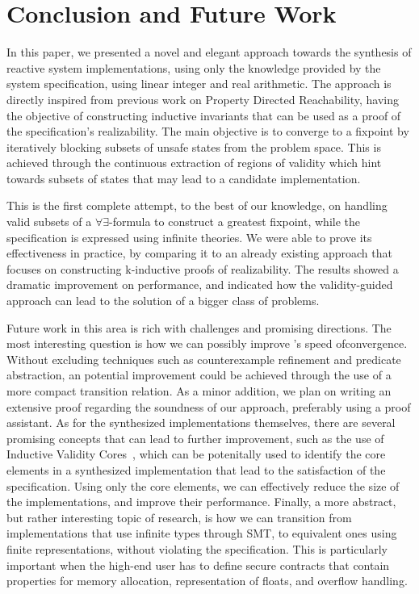 \section{Conclusion and Future Work}
\label{sec:conclusion}

In this paper, we presented a novel and elegant approach towards the synthesis
of reactive system implementations, using only the knowledge provided by the
system specification, using linear integer and real arithmetic. The approach is
directly inspired from previous work on Property Directed Reachability, having the objective of constructing inductive
invariants that can be used as a proof of the specification's realizability. The
main objective is to converge to a fixpoint by iteratively blocking subsets of
unsafe states from the problem space. This is achieved through the continuous
extraction of regions of validity which hint towards subsets of states that may
lead to a candidate implementation.

This is the first complete attempt, to the best of our knowledge, on handling
valid subsets of a $\forall\exists$-formula to construct a greatest fixpoint,
while the specification is expressed using infinite theories. We were able to
prove its effectiveness in practice, by comparing it to an already existing
approach that focuses on constructing k-inductive proofs of realizability. The
results showed a dramatic improvement on performance, and indicated how the
validity-guided approach can lead to the solution of a bigger class of problems.

Future work in this area is rich with challenges and promising directions. The
most interesting question is how we can possibly improve \jsynvg's
speed ofconvergence. Without excluding techniques such as counterexample
refinement and predicate abstraction, an potential improvement could be achieved
through the use of a more compact transition relation. As a minor addition, we
plan on writing an extensive proof regarding the soundness of our approach,
preferably using a proof assistant. As for the synthesized implementations
themselves, there are several promising concepts that can lead to further
improvement, such as the use of Inductive Validity Cores~\cite{Ghass16}, which
can be potenitally used to identify the core elements in a synthesized
implementation that lead to the satisfaction of the specification. Using only
the core elements, we can effectively reduce the size of the implementations,
and improve their performance. Finally, a more abstract, but rather interesting
topic of research, is how we can transition from implementations that use
infinite types through SMT, to equivalent ones using finite representations,
without violating the specification. This is particularly important when the
high-end user has to define secure contracts that contain properties for memory
allocation, representation of floats, and overflow handling.
